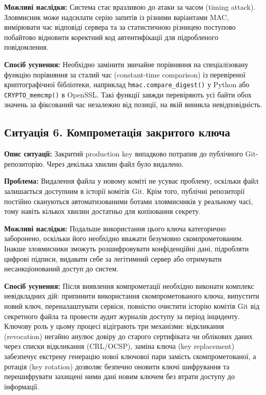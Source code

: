 \textbf{Можливі наслідки:}
Система стає вразливою до атаки за часом (timing attack). Зловмисник може надсилати серію запитів із
різними варіантами MAC, вимірювати час відповіді сервера та за статистичною різницею поступово
побайтово відновити коректний код автентифікації для підробленого повідомлення.

\textbf{Спосіб усунення:}
Необхідно замінити звичайне порівняння на спеціалізовану функцію порівняння за сталий час (constant-time
comparison) із перевіреної криптографічної бібліотеки, наприклад \texttt{hmac.compare\_digest()} у Python або
\texttt{CRYPTO\_memcmp()} в OpenSSL. Такі функції завжди перевіряють усі байти обох значень за фіксований
час незалежно від позиції, на якій виникла невідповідність.


\subsection{Ситуація 6. Компрометація закритого ключа}

\textbf{Опис ситуації:}
Закритий production key випадково потрапив до публічного Git-репозиторію. Через
декілька хвилин файл було видалено.

\textbf{Проблема:}
Видалення файла у новому коміті не усуває проблему, оскільки файл залишається доступним в історії комітів
Git. Крім того, публічні репозиторії постійно скануються автоматизованими ботами зловмисників у реальному
часі, тому навіть кількох хвилин достатньо для копіювання секрету.

\textbf{Можливі наслідки:}
Подальше використання цього ключа категорично заборонено, оскільки його необхідно вважати безумовно
скомпрометованим. Інакше зловмисники зможуть розшифровувати конфіденційні дані, підробляти цифрові
підписи, видавати себе за легітимний сервер або отримувати несанкціонований доступ до систем.

\textbf{Спосіб усунення:}
Після виявлення компрометації необхідно виконати комплекс невідкладних дій: припинити використання
скомпрометованого ключа, випустити новий ключ, переналаштувати сервіси, повністю очистити історію
комітів Git від секретного файла та провести аудит журналів доступу за період інциденту. Ключову роль у
цьому процесі відіграють три механізми: відкликання (revocation) негайно анулює довіру до старого
сертифіката чи облікових даних через списки відкликання (CRL/OCSP), заміна ключа (key replacement)
забезпечує екстрену генерацію нової ключової пари замість скомпрометованої, а ротація (key rotation)
дозволяє безпечно оновити ключі шифрування та перешифрувати захищені ними дані новим ключем без
втрати доступу до інформації.
